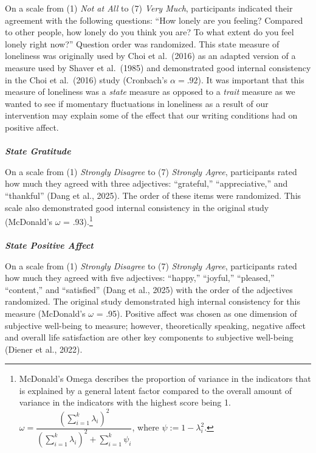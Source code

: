 \documentclass[
  letterpaper,
  DIV=11,
  numbers=noendperiod]{scrartcl}
\makeatletter
\let\oldparagraph\paragraph
\renewcommand{\paragraph}{
    \@ifstar
      \xxxParagraphStar
      \xxxParagraphNoStar
  }
\newcommand{\xxxParagraphStar}[1]{\oldparagraph*{#1}\mbox{}}
\newcommand{\xxxParagraphNoStar}[1]{\oldparagraph{#1}\mbox{}}
\makeatother
\begin{document}
On a scale from (1) \emph{Not at All} to (7) \emph{Very Much},
participants indicated their agreement with the following questions:
``How lonely are you feeling? Compared to other people, how lonely do
you think you are? To what extent do you feel lonely right now?''
Question order was randomized. This state measure of loneliness was
originally used by Choi et al.~(2016) as an adapted version of a measure
used by Shaver et al.~(1985) and demonstrated good internal consistency
in the Choi et al.~(2016) study (Cronbach's \(\alpha=.92\)). It was
important that this measure of loneliness was a \emph{state} measure as
opposed to a \emph{trait} measure as we wanted to see if momentary
fluctuations in loneliness as a result of our intervention may explain
some of the effect that our writing conditions had on positive affect.

\paragraph{\texorpdfstring{\textbf{\emph{State
Gratitude}}}{State Gratitude}}\label{state-gratitude}

On a scale from (1) \emph{Strongly Disagree} to (7) \emph{Strongly
Agree}, participants rated how much they agreed with three adjectives:
``grateful,'' ``appreciative,'' and ``thankful'' (Dang et al., 2025).
The order of these items were randomized. This scale also demonstrated
good internal consistency in the original study (McDonald's \(\omega\) =
.93).\footnote{McDonald's Omega describes the proportion of variance in
  the indicators that is explained by a general latent factor compared
  to the overall amount of variance in the indicators with the highest
  score being 1.
  \(\omega = \dfrac{\left(\sum_{i=1} ^k\lambda_i\right)^2}{\left(\sum_{i=1}^k\lambda_{i}\right)^2+\sum_{i=1}^k\psi_i}\),
  where \(\psi:=1-\lambda_i^2\).}

\paragraph{\texorpdfstring{\textbf{\emph{State Positive
Affect}}}{State Positive Affect}}\label{state-positive-affect}

On a scale from (1) \emph{Strongly Disagree} to (7) \emph{Strongly
Agree}, participants rated how much they agreed with five adjectives:
``happy,'' ``joyful,'' ``pleased,'' ``content,'' and ``satisfied'' (Dang
et al., 2025) with the order of the adjectives randomized. The original
study demonstrated high internal consistency for this measure
(McDonald's \(\omega\) = .95). Positive affect was chosen as one
dimension of subjective well-being to measure; however, theoretically
speaking, negative affect and overall life satisfaction are other key
components to subjective well-being (Diener et al., 2022).
\end{document}
